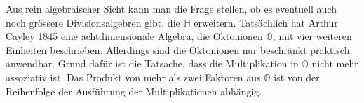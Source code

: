Aus rein algebraischer Sicht kann man die Frage stellen, ob es eventuell
auch noch grössere Divisionsalgebren gibt, die $\mathbb{H}$ erweitern.
Tatsächlich hat Arthur Cayley 1845 eine achtdimensionale Algebra,
die Oktonionen $\mathbb{O}$, mit vier weiteren Einheiten beschrieben.
%
Allerdings sind die Oktonionen nur beschränkt praktisch anwendbar.
Grund dafür ist die Tatsache, dass die Multiplikation in $\mathbb{O}$
nicht mehr assoziativ ist.
Das Produkt von mehr als zwei Faktoren aus $\mathbb{O}$ ist von der
Reihenfolge der Ausführung der Multiplikationen abhängig.






